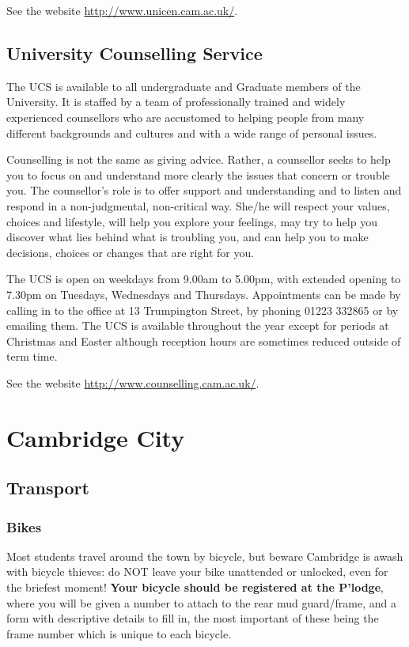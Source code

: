 \documentclass[11pt,fleqn, oneside]{book} %
\begin{document}
See the website \url{http://www.unicen.cam.ac.uk/}. 
    
\section{University Counselling Service}
    
The UCS is available to all undergraduate and Graduate members of the University.   It is staffed by a team of professionally trained and widely experienced counsellors who are accustomed to helping people from many different backgrounds and cultures and with a wide range of personal issues.  
    
Counselling is not the same as giving advice. Rather, a counsellor seeks to help you to focus on and understand more clearly the issues that concern or trouble you. The counsellor's role is to offer support and understanding and to listen and respond in a non-judgmental, non-critical way. She/he will respect your values, choices and lifestyle, will help you explore your feelings, may try to help you discover what lies behind what is troubling you, and can help you to make decisions, choices or changes that are right for you.  
    
The UCS is open on weekdays from 9.00am to 5.00pm, with extended opening to 7.30pm on Tuesdays, Wednesdays and Thursdays. Appointments can be made by calling in to the office at 13 Trumpington Street, by phoning 01223 332865 or by emailing them. The UCS is available throughout the year except for periods at Christmas and Easter although reception hours are sometimes reduced outside of term time. 
    
See the website \url{http://www.counselling.cam.ac.uk/}.
    

\chapter{Cambridge City}
\section{Transport}
\subsection{Bikes}
    
Most students travel around the town by bicycle, but beware Cambridge is awash with bicycle thieves: do NOT leave your bike unattended or unlocked, even for the briefest moment! \textbf{Your bicycle should be registered at the P’lodge}, where you will be given a number to attach to the rear mud guard/frame, and a form with descriptive details to fill in, the most important of these being the frame number which is unique to each bicycle.
    
\end{document}
